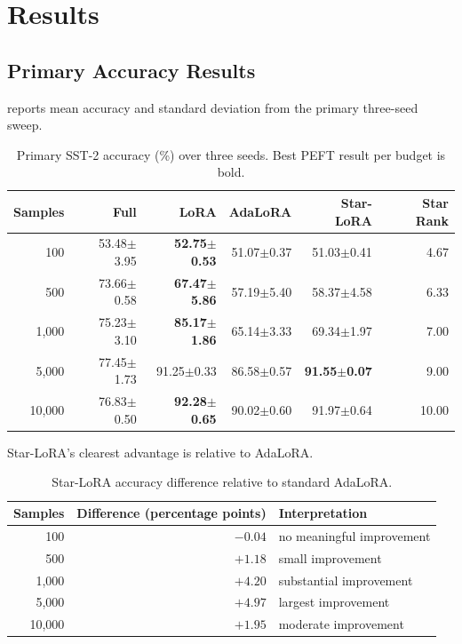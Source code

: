 \chapter{Results}
\label{chap:results}

\section{Primary Accuracy Results}

 reports mean accuracy and standard deviation from the primary
three-seed sweep.

\begin{table}[H]
\centering
\caption{Primary SST-2 accuracy (\%) over three seeds. Best PEFT result per budget is bold.}
\label{tab:primary-accuracy}
\small
\begin{tabular}{@{}rrrrrr@{}}
\toprule
Samples & Full & LoRA & AdaLoRA & Star-LoRA & Star Rank \\
\midrule
100   & 53.48$\pm$3.95 & \textbf{52.75$\pm$0.53} & 51.07$\pm$0.37 & 51.03$\pm$0.41 & 4.67 \\
500   & 73.66$\pm$0.58 & \textbf{67.47$\pm$5.86} & 57.19$\pm$5.40 & 58.37$\pm$4.58 & 6.33 \\
1,000 & 75.23$\pm$3.10 & \textbf{85.17$\pm$1.86} & 65.14$\pm$3.33 & 69.34$\pm$1.97 & 7.00 \\
5,000 & 77.45$\pm$1.73 & 91.25$\pm$0.33 & 86.58$\pm$0.57 & \textbf{91.55$\pm$0.07} & 9.00 \\
10,000& 76.83$\pm$0.50 & \textbf{92.28$\pm$0.65} & 90.02$\pm$0.60 & 91.97$\pm$0.64 & 10.00 \\
\bottomrule
\end{tabular}
\end{table}

Star-LoRA's clearest advantage is relative to AdaLoRA.
\begin{table}[H]
\centering
\caption{Star-LoRA accuracy difference relative to standard AdaLoRA.}
\label{tab:adalora-delta}
\begin{tabular}{@{}rrl@{}}
\toprule
Samples & Difference (percentage points) & Interpretation \\
\midrule
100 & $-0.04$ & no meaningful improvement \\
500 & $+1.18$ & small improvement \\
1,000 & $+4.20$ & substantial improvement \\
5,000 & $+4.97$ & largest improvement \\
10,000 & $+1.95$ & moderate improvement \\
\bottomrule
\end{tabular}
\end{table}

